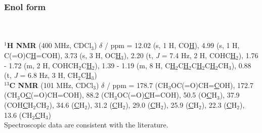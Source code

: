 \subsubsection*{Enol form }
\\[1\baselineskip]
\\[1\baselineskip]
\textbf{$^{1}$H NMR} (400 MHz, CDCl$_3$) $\delta$ / ppm = 
	12.02 (s, 1 H, CO\underline{H}), 
	4.99 (s, 1 H, C(=O)C\underline{H}=COH),
	3.73 (s, 3 H, OC\underline{H}$_3$), 
	2.20 (t, \textit{J} = 7.4 Hz, 2 H, COHC\underline{H}$_2$), 
	1.76 - 1.72 (m, 2 H, COHCH$_2$C\underline{H}$_2$),
	1.39 - 1.19 (m, 8 H, C\underline{H}$_2$C\underline{H}$_2$C\underline{H}$_2$C\underline{H}$_2$CH$_3$), 
	0.88 (t, \textit{J} = 6.8 Hz, 3 H, CH$_2$C\underline{H}$_3$)
	\\[1\baselineskip]
\textbf{$^{13}$C NMR} (101 MHz, CDCl$_3$) $\delta$ / ppm = 
	178.7 (CH$_3$OC(=O)CH=\underline{C}OH), 
	172.7 (CH$_3$O\underline{C}(=O)CH=COH), 
	88.2 (CH$_3$OC\-(=O)\underline{C}H=COH), 
	50.5 (O\underline{C}H$_3$),
	37.9 (COH\underline{C}H$_2$CH$_2$), 
	34.6 (\underline{C}H$_2$), 
	31.2 (\underline{C}H$_2$), 
	29.0 (\underline{C}H$_2$), 
	25.9 (\underline{C}H$_2$), 
	22.3 (\underline{C}H$_2$), 
	13.6 (CH$_2$\underline{C}H$_3$)
\\[1\baselineskip]
Spectroscopic data are consistent with the literature\cite{Baker2012,Scribner1978}.


